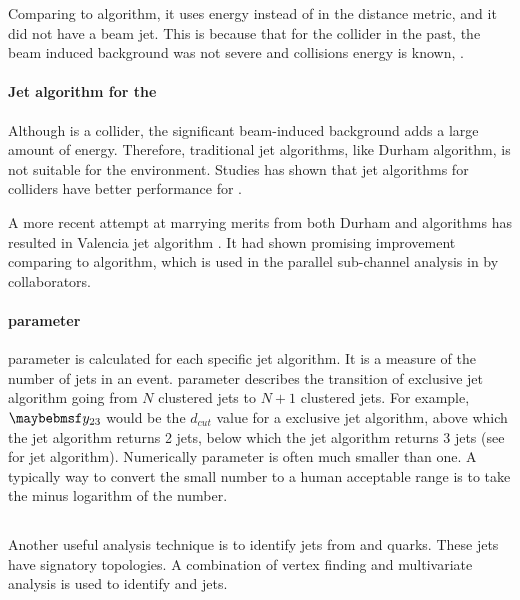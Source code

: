 Comparing to \kt algorithm, it uses energy instead of \pT in the distance metric, and it did not have a beam jet. This is because that for the \ee collider in the past, the beam induced background was not severe and collisions energy is known, \sqrtS.

\paragraph{Jet algorithm for the \CLIC}

Although \CLIC is a \ee collider, the significant beam-induced background adds a large amount of energy. Therefore, traditional \ee jet algorithms, like Durham algorithm, is not suitable for the \CLIC environment. Studies has shown that jet algorithms for \pp colliders have better performance for \CLIC \cite{Linssen:2012hp,LCD-Note-2010-006}.

A more recent attempt at marrying merits from both Durham and \kt algorithms has resulted in Valencia jet algorithm \cite{Boronat:2014hva}. It had shown promising improvement comparing to \kt algorithm, which is used in the parallel  \eeToHHbbbb  sub-channel analysis in  by collaborators.



\paragraph{\y{} parameter}
\y{} parameter is calculated for each specific jet algorithm. It is a measure of the number of jets in an event. \y{} parameter describes the transition of exclusive jet algorithm going from $N$ clustered jets to $N\!+\!1$ clustered jets. For example, $\y{23}$ would be the $d_{cut}$ value for a exclusive jet algorithm, above which the jet algorithm returns 2 jets, below which the jet algorithm returns 3 jets (see  for jet algorithm). Numerically \y{} parameter is often much smaller than one. A typically way to convert the small number to a human acceptable range is to take the minus logarithm of the number.


\subsection{\lcfiplus}
\label{sec:pandoraLCFI}
Another useful analysis technique is to identify jets from \Pbottom and \Pcharm quarks. These jets have signatory topologies. A combination of vertex finding and multivariate analysis is used to identify \Pbottom and \Pcharm jets.

